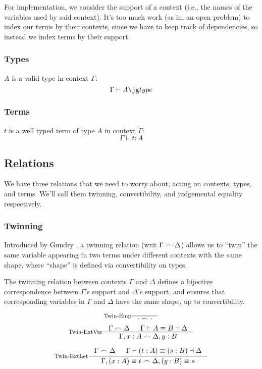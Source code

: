 For implementation, we consider the support of a context (i.e., the names of the variables used by said context).
It's too much work (as in, an open problem) to index our terms by their contexts, since we have to keep track of dependencies, so instead we index terms by their support.

\subsubsection{Types}
$A$ is a valid type in context $\Gamma$:
\[
  \Gamma \vdash \type{A}
\]

\subsubsection{Terms}
$t$ is a well typed term of type $A$ in context $\Gamma$:
\[
  \Gamma \vdash t : A
\]

\subsection{Relations}
We have three relations that we need to worry about, acting on contexts, types, and terms. We'll call them twinning, convertibility, and judgemental equality respectively.

\subsubsection{Twinning}
Introduced by Gundry \cite{gundry2013TypeInferenceHaskell} \cite{gundry2013TutorialImplementationDynamic}, a twinning relation (writ $\Gamma \frown \Delta$) allows us to ``twin'' the same variable appearing in two terms under different contexts with the same shape, where ``shape'' is defined via convertibility on types.

The twinning relation between contexts $\Gamma$ and $\Delta$ defines a bijective correspondence between $\Gamma$'s support and $\Delta$'s support, and ensures that corresponding variables in $\Gamma$ and $\Delta$ have the same shape, up to convertibility.

\[
  \inference[Twin-Emp]{}{\cdot \frown \cdot}
\]
\[
  \inference[Twin-ExtVar]
    { \Gamma \frown \Delta
    & \Gamma \vdash A \equiv B \dashv \Delta
    }
    { \Gamma, x : A \frown \Delta, y : B }
\]

\[
  \inference[Twin-ExtLet]
  { \twin{\Gamma}{\Delta}
  & \Gamma \vdash (t : A) \equiv (s : B) \dashv \Delta
  }
  {\twin{\Gamma, (x : A) \equiv t}{\Delta, (y : B) \equiv s}}
\]


